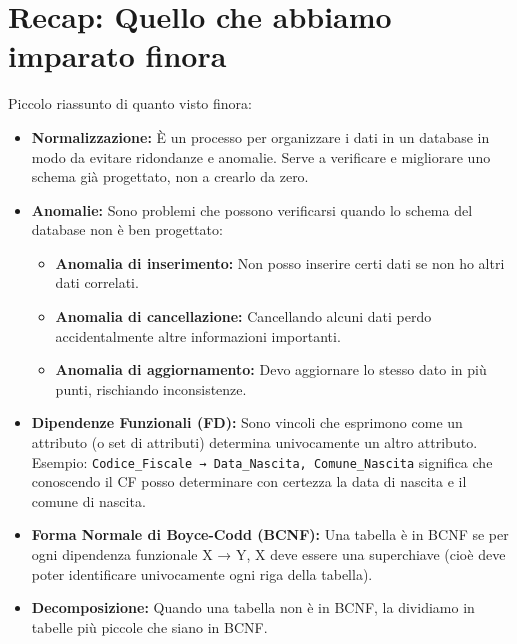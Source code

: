 \documentclass{article}
\begin{document}
	\section{Recap: Quello che abbiamo imparato finora}
	
	Piccolo riassunto di quanto visto finora:
	
	\begin{itemize}
		\item \textbf{Normalizzazione:} È un processo per organizzare i dati in un database in modo da evitare ridondanze e anomalie. Serve a verificare e migliorare uno schema già progettato, non a crearlo da zero.
		
		\item \textbf{Anomalie:} Sono problemi che possono verificarsi quando lo schema del database non è ben progettato:
		\begin{itemize}
			\item \textbf{Anomalia di inserimento:} Non posso inserire certi dati se non ho altri dati correlati.
			\item \textbf{Anomalia di cancellazione:} Cancellando alcuni dati perdo accidentalmente altre informazioni importanti.
			\item \textbf{Anomalia di aggiornamento:} Devo aggiornare lo stesso dato in più punti, rischiando inconsistenze.
		\end{itemize}
		
		\item \textbf{Dipendenze Funzionali (FD):} Sono vincoli che esprimono come un attributo (o set di attributi) determina univocamente un altro attributo. Esempio: \texttt{Codice\_Fiscale → Data\_Nascita, Comune\_Nascita} significa che conoscendo il CF posso determinare con certezza la data di nascita e il comune di nascita.
		
		\item \textbf{Forma Normale di Boyce-Codd (BCNF):} Una tabella è in BCNF se per ogni dipendenza funzionale X → Y, X deve essere una superchiave (cioè deve poter identificare univocamente ogni riga della tabella).
		
		\item \textbf{Decomposizione:} Quando una tabella non è in BCNF, la dividiamo in tabelle più piccole che siano in BCNF.
		

\end{itemize}
\end{document}
